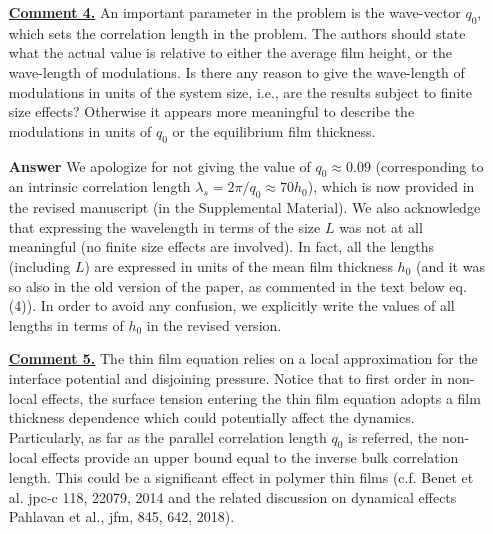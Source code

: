 \documentclass[12pt,english]{article}
\begin{document}
\begin{itemize}
{}

\item[ \textbf{\underline{Comment 4.}}]
{
An important parameter in the problem is the wave-vector $q_0$, which sets the correlation length in the problem. 
The authors should state what the actual value is relative to either the average film height, or the wave-length of modulations. 
Is there any reason to give the wave-length of modulations in units of the system size, i.e., are the results subject to finite size effects? Otherwise it appears more meaningful to describe the modulations in units of $q_0$ or the equilibrium film thickness.
}

\item[ \textbf{{Answer}}]
{
We apologize for not giving the value of $q_0 \approx 0.09$ (corresponding to an intrinsic correlation length 
$\lambda_s = 2\pi/q_0 \approx 70 h_0$), which is now provided in the revised manuscript (in the 
Supplemental Material). We also acknowledge that expressing the wavelength in terms of the size $L$
was not at all meaningful (no finite size effects are involved). In fact, all the lengths (including $L$) are expressed in units of the mean film thickness $h_0$ (and it was so also in the old version of the paper, as commented in the text below eq. (4)). In order to avoid any confusion, we explicitly write 
the values of all lengths in terms of $h_0$ in the revised version.
}

\item[ \textbf{\underline{Comment 5.}}]
{
The thin film equation relies on a local approximation for the interface potential and disjoining pressure. 
Notice that to first order in non-local effects, the surface tension entering the thin film equation adopts a film thickness dependence which could potentially affect the dynamics. 
Particularly, as far as the parallel correlation length $q_0$ is referred, the non-local effects provide an upper bound equal to the inverse bulk correlation length. 
This could be a significant effect in polymer thin films (c.f. Benet et al. jpc-c 118, 22079, 2014 and the related discussion on dynamical effects Pahlavan et al., jfm, 845, 642, 2018).
}


\end{itemize}
\end{document}
